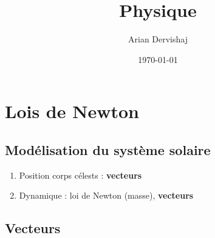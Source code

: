 \documentclass[a4paper, 12pt]{article}
\title{Physique}
\author{Arian Dervishaj}
\date{\today}
\begin{document}
\setlength{\parindent}{0pt}
\maketitle
\pagebreak

\section*{Lois de Newton}

\subsection*{Modélisation du système solaire}

\begin{enumerate}
    \item Position corps célests : \textbf{vecteurs}
    \item Dynamique : loi de Newton (masse), \textbf{vecteurs}
\end{enumerate}

\subsection*{Vecteurs}
\end{document}
